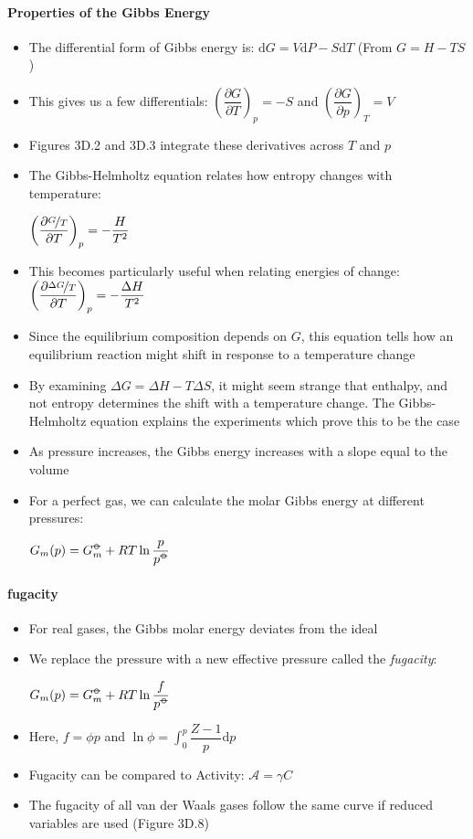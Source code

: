 \documentclass[12pt, openany, letterpaper]{memoir}
\begin{document}
\paragraph{Properties of the Gibbs Energy}
\begin{itemize}
	\item The differential form of Gibbs energy is: $\mathrm{d}G = V\mathrm{d}P-S\mathrm{d}T$ (From $G=H-TS$)
	\item This gives us a few differentials: $\left(\dfrac{\partial G}{\partial T}\right)_p = -S$ and $\left(\dfrac{\partial G}{\partial p}\right)_T = V$
	\item Figures 3D.2 and 3D.3 integrate these derivatives across $T$ and $p$
	\item The Gibbs-Helmholtz equation relates how entropy changes with temperature:

	      $\left(\dfrac{\partial \nicefrac{G}{T}}{\partial T}\right)_p = -\dfrac{H}{T^2}$
	\item This becomes particularly useful when relating energies of change: $\left(\dfrac{\partial \nicefrac{\Delta G}{T}}{\partial T}\right)_p = -\dfrac{\Delta H}{T^2}$
	\item Since the equilibrium composition depends on $G$, this equation tells how an equilibrium reaction might shift in response to a temperature change
	\item By examining $\Delta G = \Delta H - T\Delta S$, it might seem strange that enthalpy, and not entropy determines the shift with a temperature change. The Gibbs-Helmholtz equation explains the experiments which prove this to be the case
	\item As pressure increases, the Gibbs energy increases with a slope equal to the volume
	\item For a perfect gas, we can calculate the molar Gibbs energy at different pressures:

	      $G_m(p)=G_m^{\std}+RT\ln\dfrac{p}{p^{\std}}$
\end{itemize}
\paragraph{fugacity}
\begin{itemize}
	\item For real gases, the Gibbs molar energy deviates from the ideal
	\item We replace the pressure with a new effective pressure called the \emph{fugacity}:

	      $G_m(p)=G_m^{\std}+RT\ln\dfrac{f}{p^{\std}}$
	\item Here, $f = \phi p$ and $\ln\phi = \displaystyle\int_0^p \dfrac{Z-1}{p}\mathrm{d}p$
	\item Fugacity can be compared to Activity: $\mathcal{A} = \gamma C$
	\item The fugacity of all van der Waals gases follow the same curve if reduced variables are used (Figure 3D.8)
\end{itemize}
\end{document}
